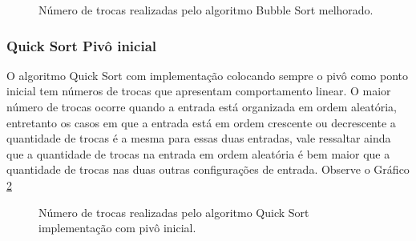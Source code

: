 \documentclass[conference,onecolumn]{IEEEtran}
\begin{document}
\begin{figure}[H]
\begin{center}
\end{center}
\caption{Número de trocas realizadas pelo algoritmo Bubble Sort melhorado.}
\label{graf:bubble-sort-melhorado-troca}
\end{figure}

\subsubsection{Quick Sort Pivô inicial}

O algoritmo Quick Sort com implementação colocando sempre o pivô como ponto inicial tem números de trocas que apresentam comportamento linear. O maior número de trocas ocorre quando a entrada está organizada em ordem aleatória, entretanto os casos em que a entrada está em ordem crescente ou decrescente a quantidade de trocas é a mesma para essas duas entradas, vale ressaltar ainda que a quantidade de trocas na entrada em ordem aleatória é bem maior que a quantidade de trocas nas duas outras configurações de entrada. Observe o Gráfico \ref{graf:quick-inicial-troca}

\begin{figure}[H]
\begin{center}
\end{center}
\caption{Número de trocas realizadas pelo algoritmo Quick Sort implementação com pivô inicial.}
\label{graf:quick-inicial-troca}
\end{figure}
\end{document}
